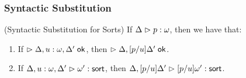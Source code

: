 \subsubsection{Syntactic Substitution}

\begin{lemma}{(Syntactic Substitution for Sorts)}
If $\judgeA{p}{\omega}$, then we have that:

\begin{enumerate}
\item If $\judgeACtx{\Delta, u:\omega, \Delta'}$, then  
         $\judgeACtx{\Delta, [p/u]\Delta'}$. 
\item If $\judgeSort[\Delta, u:\omega, \Delta']{\omega'}$,  then
         $\judgeSort[{\Delta, [p/u]\Delta'}]{[p/u]\omega'}$. 
\end{enumerate}
\end{lemma}
